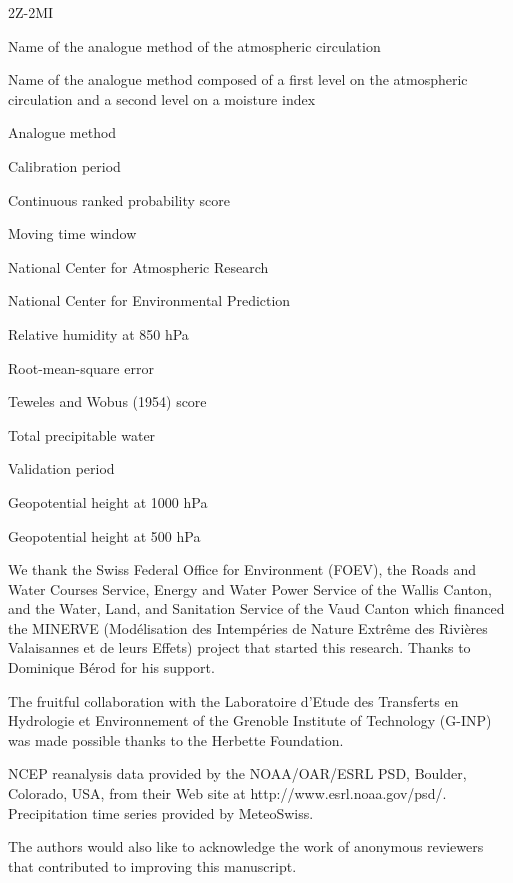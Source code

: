 \documentclass[hess, manuscript]{copernicus}
\begin{document}
	\begin{labeling}{2Z-2MI}
		\item [2Z] Name of the analogue method of the atmospheric circulation
		\item [2Z-2MI] Name of the analogue method composed of a first level on the atmospheric circulation and a second level on a moisture index
		\item [AM] Analogue method
		\item [CP] Calibration period
		\item [CRPS] Continuous ranked probability score
		\item [MTW] Moving time window
		\item [NCAR] National Center for Atmospheric Research
		\item [NCEP] National Center for Environmental Prediction
		\item [RH850] Relative humidity at 850 hPa
		\item [RMSE] Root-mean-square error
		\item [S1] Teweles and Wobus (1954) score
		\item [TPW] Total precipitable water
		\item [VP] Validation period
		\item [Z1000] Geopotential height at 1000 hPa
		\item [Z500] Geopotential height at 500 hPa
	\end{labeling}
	
		
	
	
	
	\begin{acknowledgements}
		We thank the Swiss Federal Office for Environment (FOEV), the Roads and Water Courses Service, Energy and Water Power Service of the Wallis Canton, and the Water, Land, and Sanitation Service of the Vaud Canton which financed the MINERVE (Mod\'{e}lisation des Intemp\'{e}ries de Nature Extr\^{e}me des Rivi\`{e}res Valaisannes et de leurs Effets) project that started this research. Thanks to Dominique B\'{e}rod for his support.
		
		The fruitful collaboration with the Laboratoire d'Etude des Transferts en Hydrologie et Environnement of the Grenoble Institute of Technology (G-INP) was made possible thanks to the Herbette Foundation. 
		
		NCEP reanalysis data provided by the NOAA/OAR/ESRL PSD, Boulder, Colorado, USA, from their Web site at http://www.esrl.noaa.gov/psd/. Precipitation time series provided by MeteoSwiss.
		
		The authors would also like to acknowledge the work of anonymous reviewers that contributed to improving this manuscript. 
	\end{acknowledgements}
	
\end{document}
